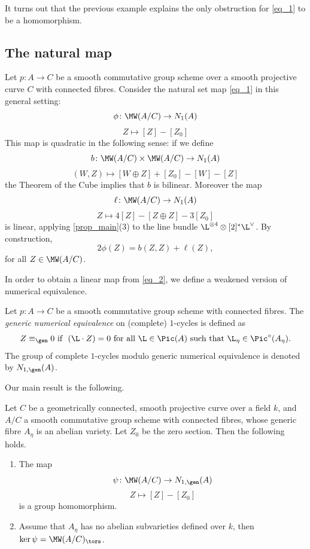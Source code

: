 \documentclass[12pt, english]{amsart}
\begin{document}
\noindent It turns out that the previous example explains the only obstruction for \autoref{eq_1} to be a homomorphism.

\subsection{The natural map}
Let $p \colon A \to C$ be a smooth commutative group scheme over a smooth projective curve $C$ with connected fibres. Consider the natural set map \autoref{eq_1} in this general setting:
\begin{equation}\label{eq_2}
\phi\colon \MW(A/C) \to N_1(A)
\end{equation}
$$Z\mapsto [Z]-[Z_0]$$
This map is quadratic in the following sense: if we define
$$b\colon \MW(A/C)\times \MW(A/C) \to N_1(A)$$
$$(W,Z) \mapsto [W\oplus Z] + [Z_0] -[W] -[Z]$$
the Theorem of the Cube implies that $b$ is bilinear. Moreover the map
$$\ell\colon \MW(A/C)\to N_1(A)$$
$$Z \mapsto 4[Z] - [Z \oplus Z] - 3[Z_0]$$
is linear, applying \autoref{prop_main}(3) to the line bundle $\L^{\otimes 4}\otimes [2]^*\L^\vee$. By construction,
$$2\phi(Z)=b(Z,Z)+\ell(Z),$$
for all $Z\in\MW(A/C)$.

\noindent In order to obtain a linear map from \autoref{eq_2}, we define a weakened version of numerical equivalence.

\begin{definition}\label{def_N1gen}
Let $p \colon A \to C$ be a smooth commutative group scheme with connected fibres. The \emph{generic numerical equivalence} on (complete) $1$-cycles is defined as
$$Z\equiv_{\gen}0 \text{ if } \ (\L\cdot Z)=0 \ \text{for all } \L \in \Pic(A) \text{ such that\ } \L_{\eta} \in \Pic^\circ(A_{\eta}).$$
The group of complete $1$-cycles modulo generic numerical equivalence is denoted by $N_{1,\gen}(A)$.
\end{definition}


\noindent Our main result is the following.

\begin{theorem}\label{main_thm}
Let $C$ be a geometrically connected, smooth projective curve over a field $k$, and $A/C$
a smooth commutative group scheme with connected fibres, whose generic fibre $A_\eta$ is an abelian
variety. Let $Z_0$ be the zero section. Then the following holds.
\begin{enumerate}
\item The map \begin{equation}
\psi\colon \MW(A/C) \to  N_{1,\gen}(A)
\end{equation}
$$Z \mapsto [Z]-[Z_0]$$
is a group homomorphism.
\item Assume that $A_\eta$ has no abelian subvarieties defined over $k$, then $\ker \psi = \MW(A/C)_{\tors}$.
\end{enumerate}
\end{theorem}
\end{document}
